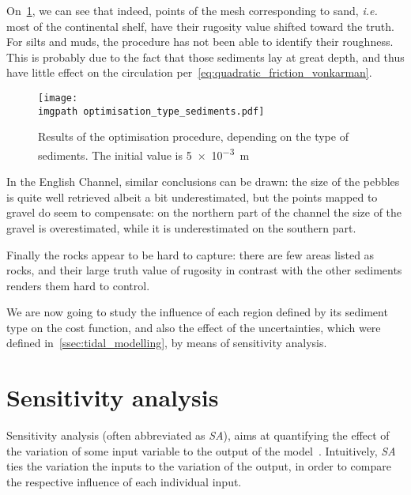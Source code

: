 \documentclass[../../Main_ManuscritThese.tex]{subfiles}
\newcommand\imgpath{/home/victor/acadwriting/Manuscrit/Text/Chapter5/img/}
\begin{document}
On~\cref{fig:optimisation_type_sediments}, we can see that indeed,
points of the mesh corresponding to sand, \emph{i.e.} most of the
continental shelf, have their rugosity value shifted toward the truth.
For silts and muds, the procedure has not been able to identify their
roughness. This is probably due to the fact that those sediments lay
at great depth, and thus have little effect on the circulation
per~\cref{eq:quadratic_friction_vonkarman}.
%
%
\begin{figure}[ht]
  \centering
  \texttt{[image: \\imgpath optimisation\_type\_sediments.pdf]}
  \caption{\label{fig:optimisation_type_sediments} Results of the
    optimisation procedure, depending on the type of sediments. The
    initial value is \SI{5e-3}{\meter}}
\end{figure}

In the English Channel, similar conclusions can be drawn: the size of
the pebbles is quite well retrieved albeit a bit
underestimated, but the points mapped to gravel do
seem to compensate: on the northern part of the channel the size of
the gravel is overestimated, while it is underestimated on the
southern part.

Finally the rocks appear to be hard to capture: there are few areas
listed as rocks, and their large truth value of rugosity in contrast
with the other sediments renders them hard to
control.%

We are now going to study the influence of each region defined by its
sediment type on the cost function, and also the effect of the
uncertainties, which were defined in~\cref{ssec:tidal_modelling}, by
means of sensitivity analysis.

%   


\section{Sensitivity analysis}
\label{sec:sensitivity-analysis}
Sensitivity analysis (often abbreviated as \emph{SA}), aims at
quantifying the effect of the variation of some input variable to the
output of the model~\cite{iooss_revue_2011,janon_analyse_2012}.
Intuitively, \emph{SA} ties the variation the inputs to
the variation of the output, in order to compare the respective
influence of each individual input.
\end{document}
